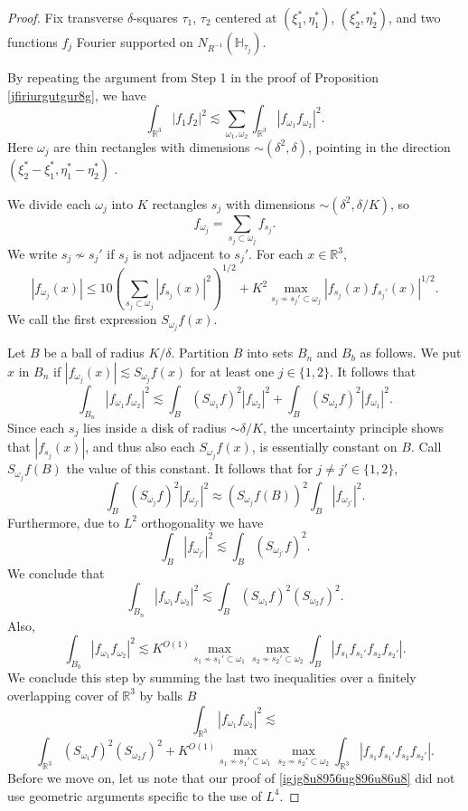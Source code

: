 \documentclass{amsart}%
\numberwithin{equation}{section}
\newcommand{\ZH}{\mathbb{H}}
\newcommand{\R}{\mathbb{R}}
\newcommand{\1}{\mathbbm{1}}
\begin{document}
	\begin{proof}
		Fix transverse $\delta$-squares $\tau_1$, $\tau_2$ centered at $(\xi_1^*,\eta_1^*)$, $(\xi_2^*,\eta_2^*)$, and two functions $f_j$ Fourier supported on $N_{R^{-1}}(\ZH_{\tau_j})$.
	\medskip
		
	 By repeating the argument from Step 1 in the proof of Proposition \ref{jfiriurgutgur8g}, we have 
		\begin{equation}
			\label{jjurgytg8yu869i09i09hhi90h}	
			\int_{\R^3}|f_1f_2|^2\lesssim \sum_{\omega_1,\omega_2}\int_{\R^3}|f_{\omega_1}f_{\omega_2}|^2.
		\end{equation}
		Here $\omega_j$ are thin rectangles with dimensions $\sim (\delta^2,\delta)$, pointing in the direction $(\xi_2^*-\xi_1^*,\eta_1^*-\eta_2^*)$ .

    \bigskip
		
	 We divide each $\omega_j$ into $K$ rectangles $s_j$ with dimensions $\sim (\delta^2,\delta/K)$, so
		$$f_{\omega_j}=\sum_{s_j\subset \omega_j}f_{s_j}.$$
		We write $s_j\not\sim s_j'$ if $s_j$ is not adjacent to $s_j'$.
	For each $x\in\R^3$,
		$$|f_{\omega_j}(x)|\le 10(\sum_{s_j\subset \omega_j}|f_{s_j}(x)|^2)^{1/2}+K^2\max_{s_j\not\sim s_{j}'\subset \omega_j}|f_{s_j}(x)f_{s_j'}(x)|^{1/2}.$$
		We call the first expression $S_{\omega_j}f(x)$.
		
		Let $B$ be a ball of radius $K/\delta$. Partition $B$ into sets $B_n$ and  $B_b$ as follows. We put $x$ in $B_n$ if $|f_{\omega_j}(x)|\lesssim S_{\omega_j}f(x)$ for at least one $j\in\{1,2\}$. It follows that
		$$\int_{B_n}|f_{\omega_1}f_{\omega_2}|^2\lesssim \int_{B}(S_{\omega_1}f)^2|f_{\omega_2}|^2+\int_{B}(S_{\omega_2}f)^2|f_{\omega_1}|^2.$$
		Since each $s_j$ lies inside a disk of radius $\sim \delta/K$,  the uncertainty principle shows that $|f_{s_j}(x)|$, and thus also each $S_{\omega_j}f(x)$, is essentially constant on $B$. Call $S_{\omega_j}f(B)$ the value of this constant. 
		It follows that for $j\not=j'\in\{1,2\}$,
		$$\int_{B}(S_{\omega_j}f)^2|f_{\omega_{j'}}|^2\approx (S_{\omega_j}f(B))^2\int_B|f_{\omega_{j'}}|^2.$$
		Furthermore, due to $L^2$ orthogonality we have
		$$\int_B|f_{\omega_{j'}}|^2\lesssim \int_B (S_{\omega_{j'}}f)^2.$$
		We conclude that
		$$\int_{B_n}|f_{\omega_1}f_{\omega_2}|^2\lesssim \int_{B}(S_{\omega_1}f)^2(S_{\omega_2f})^2.$$
		Also,
		$$\int_{B_b}|f_{\omega_1}f_{\omega_2}|^2\lesssim K^{O(1)}\max_{s_1\not\sim s_{1}'\subset \omega_1}\max_{s_2\not\sim s_{2}'\subset \omega_2}\int_B |f_{s_1}f_{s_1'}f_{s_2}f_{s_2'}|.$$We conclude this step by summing the last two inequalities over a finitely overlapping cover of $\R^3$ by balls $B$
		$$\int_{\R^3}|f_{\omega_1}f_{\omega_2}|^2\lesssim$$
		\begin{equation}
			\label{igjg8u8956ug896u86u8}	
			\int_{\R^3}(S_{\omega_1}f)^2(S_{\omega_2f})^2+K^{O(1)}\max_{s_1\not\sim s_{1}'\subset \omega_1}\max_{s_2\not\sim s_{2}'\subset \omega_2}\int_{\R^3} |f_{s_1}f_{s_1'}f_{s_2}f_{s_2'}|.
		\end{equation}
        Before we move on, let us note that our proof of \eqref{igjg8u8956ug896u86u8}	did not use geometric arguments specific to the use of $L^4$.  
	\medskip
		

\end{proof}
\end{document}

